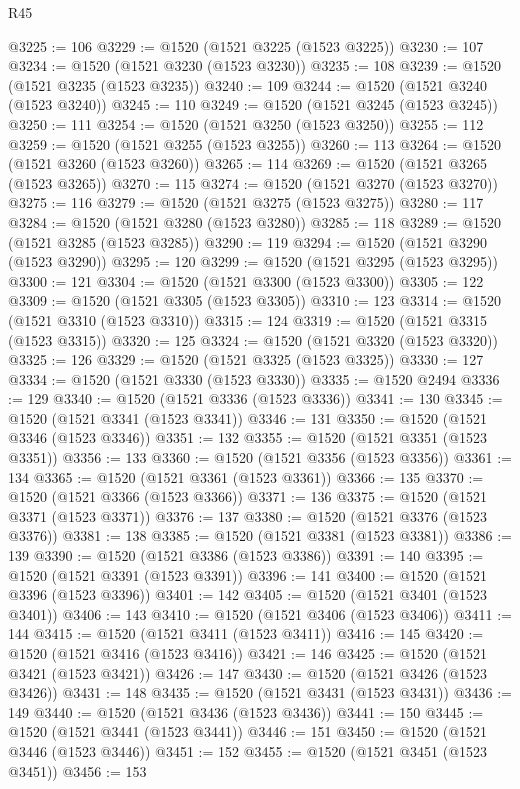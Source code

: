 \begin{lexlean}{R45}
\begin{coremodule}
{@3225 := 106
@3229 := @1520 (@1521 @3225 (@1523 @3225))
@3230 := 107
@3234 := @1520 (@1521 @3230 (@1523 @3230))
@3235 := 108
@3239 := @1520 (@1521 @3235 (@1523 @3235))
@3240 := 109
@3244 := @1520 (@1521 @3240 (@1523 @3240))
@3245 := 110
@3249 := @1520 (@1521 @3245 (@1523 @3245))
@3250 := 111
@3254 := @1520 (@1521 @3250 (@1523 @3250))
@3255 := 112
@3259 := @1520 (@1521 @3255 (@1523 @3255))
@3260 := 113
@3264 := @1520 (@1521 @3260 (@1523 @3260))
@3265 := 114
@3269 := @1520 (@1521 @3265 (@1523 @3265))
@3270 := 115
@3274 := @1520 (@1521 @3270 (@1523 @3270))
@3275 := 116
@3279 := @1520 (@1521 @3275 (@1523 @3275))
@3280 := 117
@3284 := @1520 (@1521 @3280 (@1523 @3280))
@3285 := 118
@3289 := @1520 (@1521 @3285 (@1523 @3285))
@3290 := 119
@3294 := @1520 (@1521 @3290 (@1523 @3290))
@3295 := 120
@3299 := @1520 (@1521 @3295 (@1523 @3295))
@3300 := 121
@3304 := @1520 (@1521 @3300 (@1523 @3300))
@3305 := 122
@3309 := @1520 (@1521 @3305 (@1523 @3305))
@3310 := 123
@3314 := @1520 (@1521 @3310 (@1523 @3310))
@3315 := 124
@3319 := @1520 (@1521 @3315 (@1523 @3315))
@3320 := 125
@3324 := @1520 (@1521 @3320 (@1523 @3320))
@3325 := 126
@3329 := @1520 (@1521 @3325 (@1523 @3325))
@3330 := 127
@3334 := @1520 (@1521 @3330 (@1523 @3330))
@3335 := @1520 @2494
@3336 := 129
@3340 := @1520 (@1521 @3336 (@1523 @3336))
@3341 := 130
@3345 := @1520 (@1521 @3341 (@1523 @3341))
@3346 := 131
@3350 := @1520 (@1521 @3346 (@1523 @3346))
@3351 := 132
@3355 := @1520 (@1521 @3351 (@1523 @3351))
@3356 := 133
@3360 := @1520 (@1521 @3356 (@1523 @3356))
@3361 := 134
@3365 := @1520 (@1521 @3361 (@1523 @3361))
@3366 := 135
@3370 := @1520 (@1521 @3366 (@1523 @3366))
@3371 := 136
@3375 := @1520 (@1521 @3371 (@1523 @3371))
@3376 := 137
@3380 := @1520 (@1521 @3376 (@1523 @3376))
@3381 := 138
@3385 := @1520 (@1521 @3381 (@1523 @3381))
@3386 := 139
@3390 := @1520 (@1521 @3386 (@1523 @3386))
@3391 := 140
@3395 := @1520 (@1521 @3391 (@1523 @3391))
@3396 := 141
@3400 := @1520 (@1521 @3396 (@1523 @3396))
@3401 := 142
@3405 := @1520 (@1521 @3401 (@1523 @3401))
@3406 := 143
@3410 := @1520 (@1521 @3406 (@1523 @3406))
@3411 := 144
@3415 := @1520 (@1521 @3411 (@1523 @3411))
@3416 := 145
@3420 := @1520 (@1521 @3416 (@1523 @3416))
@3421 := 146
@3425 := @1520 (@1521 @3421 (@1523 @3421))
@3426 := 147
@3430 := @1520 (@1521 @3426 (@1523 @3426))
@3431 := 148
@3435 := @1520 (@1521 @3431 (@1523 @3431))
@3436 := 149
@3440 := @1520 (@1521 @3436 (@1523 @3436))
@3441 := 150
@3445 := @1520 (@1521 @3441 (@1523 @3441))
@3446 := 151
@3450 := @1520 (@1521 @3446 (@1523 @3446))
@3451 := 152
@3455 := @1520 (@1521 @3451 (@1523 @3451))
@3456 := 153
}
\end{coremodule}
\end{lexlean}
